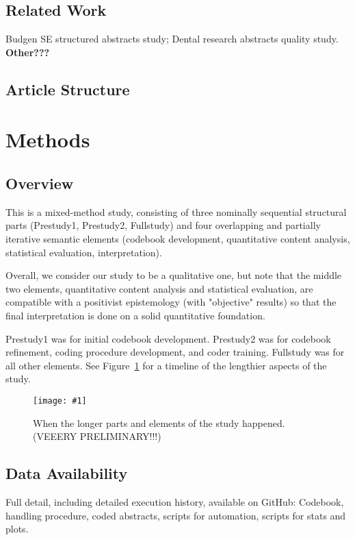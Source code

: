\documentclass[10pt,journal,compsoc]{IEEEtran}
\newcommand{\Plot}[2]{%
	\begin{figure}[!t]%
		\centering\texttt{[image: \#1]}%
		\vspace{-4mm}\caption{#2}\label{#1}%
	\end{figure}}
\newcommand{\Todo}[1]{\bgroup\bf\Large #1\egroup}
\begin{document}
\subsection{Related Work}

Budgen SE structured abstracts study; Dental research abstracts quality study.
\Todo{Other???}


\subsection{Article Structure}



\section{Methods}


\subsection{Overview}

\noindent
This is a mixed-method study, consisting of three nominally sequential structural parts
(Prestudy1, Prestudy2, Fullstudy) and
four overlapping and partially iterative semantic elements
(codebook development, quantitative content analysis,
statistical evaluation, interpretation).

Overall, we consider our study to be a qualitative one, but note that the middle two elements,
quantitative content analysis and statistical evaluation,
are compatible with a positivist epistemology (with "objective" results) so that 
the final interpretation is done on a solid quantitative foundation.

Prestudy1 was for initial codebook development.
Prestudy2 was for codebook refinement,
coding procedure development,
and coder training.
Fullstudy was for all other elements.
See Figure~\ref{qabstracts_timeline} for a timeline of the lengthier aspects of the study.

\Plot{qabstracts_timeline}{%
	When the longer parts and elements of the study happened. (VEEERY PRELIMINARY!!!)}


\subsection{Data Availability}

\noindent
Full detail, including detailed execution history, available on GitHub:
Codebook, handling procedure, coded abstracts, scripts for automation, scripts for stats and plots.
\end{document}
